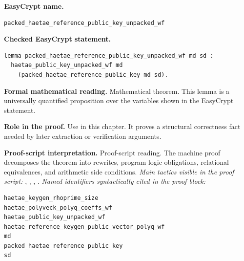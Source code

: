 \begin{formaltheorem}
\noindent\textbf{EasyCrypt name.}
\begin{lstlisting}[language=EasyCrypt,basicstyle=\ttfamily\scriptsize]
packed_haetae_reference_public_key_unpacked_wf
\end{lstlisting}
\noindent\textbf{Checked EasyCrypt statement.}
\begin{lstlisting}[language=EasyCrypt,basicstyle=\ttfamily\scriptsize]
lemma packed_haetae_reference_public_key_unpacked_wf md sd :
  haetae_public_key_unpacked_wf md
    (packed_haetae_reference_public_key md sd).
\end{lstlisting}
\noindent\textbf{Formal mathematical reading.}
Mathematical theorem. This lemma is a universally quantified proposition over the variables shown in the EasyCrypt statement.

\noindent\textbf{Role in the proof.}
Use in this chapter. It proves a structural correctness fact needed by later extraction or verification arguments.

\noindent\textbf{Proof-script interpretation.}
Proof-script reading. The machine proof decomposes the theorem into rewrites, program-logic obligations, relational equivalences, and arithmetic side conditions.
\emph{Main tactics visible in the proof script:} , , , .
\emph{Named identifiers syntactically cited in the proof block:}
\begin{lstlisting}[language=EasyCrypt,basicstyle=\ttfamily\scriptsize]
haetae_keygen_rhoprime_size
haetae_polyveck_polyq_coeffs_wf
haetae_public_key_unpacked_wf
haetae_reference_keygen_public_vector_polyq_wf
md
packed_haetae_reference_public_key
sd
\end{lstlisting}

\end{formaltheorem}


